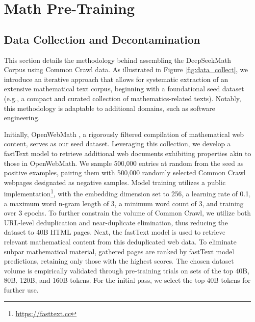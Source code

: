 \section{Math Pre-Training}

\subsection{Data Collection and Decontamination} This section details the methodology behind assembling the DeepSeekMath Corpus using Common Crawl data. As illustrated in Figure \ref{fig:data_collect}, we introduce an iterative approach that allows for systematic extraction of an extensive mathematical text corpus, beginning with a foundational seed dataset (e.g., a compact and curated collection of mathematics-related texts). Notably, this methodology is adaptable to additional domains, such as software engineering.

Initially, OpenWebMath \citep{openwebmath}, a rigorously filtered compilation of mathematical web content, serves as our seed dataset. Leveraging this collection, we develop a fastText model \citep{joulin2016fasttext} to retrieve additional web documents exhibiting properties akin to those in OpenWebMath. We sample 500,000 entries at random from the seed as positive examples, pairing them with 500,000 randomly selected Common Crawl webpages designated as negative samples. Model training utilizes a public implementation\footnote{\url{https://fasttext.cc}}, with the embedding dimension set to 256, a learning rate of 0.1, a maximum word n-gram length of 3, a minimum word count of 3, and training over 3 epochs. To further constrain the volume of Common Crawl, we utilize both URL-level deduplication and near-duplicate elimination, thus reducing the dataset to 40B HTML pages. Next, the fastText model is used to retrieve relevant mathematical content from this deduplicated web data. To eliminate subpar mathematical material, gathered pages are ranked by fastText model predictions, retaining only those with the highest scores. The chosen dataset volume is empirically validated through pre-training trials on sets of the top 40B, 80B, 120B, and 160B tokens. For the initial pass, we select the top 40B tokens for further use.

